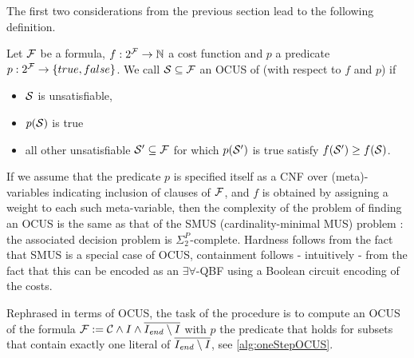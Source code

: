 The first two considerations from the previous section lead to the following definition. 

\begin{definition}
   Let $\mathcal{F} $ be a formula, $f:2^{\mathcal{F} } \to \mathbb{N}$ a cost function and  $p$ a predicate $p: 2^{\mathcal{F} }\to \{true,false\}$.  We call %
    $\mathcal{S} \subseteq \mathcal{F} $ an OCUS of \formula (with respect to $f$ and $p$) if \begin{itemize}                                      
      \item $\mathcal{S}$ is unsatisfiable,
      \item $p(\mathcal{S})$ is true
      \item all other unsatisfiable $\mathcal{S}'\subseteq \mathcal{F} $ for which $p(\mathcal{S}')$ is true satisfy $f(\mathcal{S}')\geq f(\mathcal{S})$.
    \end{itemize}
\end{definition}


If we assume that the predicate $p$ is specified itself as a CNF over (meta)-variables indicating inclusion of clauses of $\mathcal{F}$, and $f$ is obtained by assigning a weight to each such meta-variable, then the complexity of the problem of finding an OCUS is the same as that of the SMUS (cardinality-minimal MUS) problem  \cite{ignatiev2015smallest}: the associated decision problem is $\Sigma^P_2$-complete. Hardness follows from the fact that SMUS is a special case of OCUS, containment follows - intuitively - from the fact that this can be encoded as an $\exists\forall$-QBF using a Boolean circuit encoding of the costs. 

Rephrased in terms of OCUS, the task of the procedure \onestep is to compute an OCUS of the formula $\mathcal{F}  := \mathcal{C} \land I\land \overline{I_\mathit{end} \setminus I}$ with $p$ the predicate that holds for subsets  that contain exactly one literal of $\overline{I_\mathit{end} \setminus I}$, see \cref{alg:oneStepOCUS}. 

